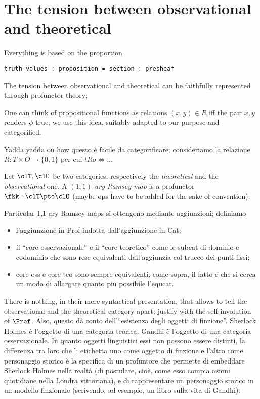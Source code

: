 \documentclass[a4paper]{../birkjour}
\begin{document}
\section{The tension between observational and theoretical}
\label{sec:orge11c3c4}
Everything is based on the proportion
\begin{verbatim}
truth values : proposition = section : presheaf
\end{verbatim}
The tension between observational and theoretical can be faithfully represented through profunctor theory;
\begin{remark}
  One can think of propositional functions as relations $(x,y)\in R$ iff the pair $x,y$ renders $\phi$ true; we use this idea, suitably adapted to our purpose and categorified.
\end{remark}
Yadda yadda on how questo è facile da categorificare; consideriamo la relazione $R : T \times O \to \{0,1\}$ per cui $tRo \iff \dots$
\begin{definition}
  Let $\clT,\clO$ be two categories, respectively the \emph{theoretical} and the \emph{observational} one. A \emph{$(1,1)$-ary Ramsey map} is a profunctor $\fkk : \clT \pto \clO$ (maybe ops have to be added for the sake of convention).
\end{definition}
\begin{remark}
  Particolar 1,1-ary Ramsey maps si ottengono mediante aggiunzioni; definiamo
  \begin{itemize}
    \item l'aggiunzione in Prof indotta dall'aggiunzione in Cat;
    \item il ``core osservazionale'' e il ``core teoretico'' come le subcat di dominio e codominio che sono rese equivalenti dall'aggiunzia col trucco dei punti fissi;
    \item core oss e core teo sono sempre equivalenti; come sopra, il fatto è che si cerca un modo di allargare quanto piu possibile l'equcat.
  \end{itemize}
\end{remark}
There is nothing, in their mere syntactical presentation, that allows to tell the observational and the theoretical category apart; justify with the self-involution of $\Prof$. Also, questo dà conto dell'``esistenza degli oggetti di finzione''. Sherlock Holmes è l'oggetto di una categoria teorica. Gandhi è l'oggetto di una categoria osservazionale. In quanto oggetti linguistici essi non possono essere distinti, la differenza tra loro che li etichetta uno come oggetto di finzione e l'altro come personaggio storico è la specifica di un profuntore che permette di embeddare Sherlock Holmes nella realtà (di postulare, cioè, come esso compia azioni quotidiane nella Londra vittoriana), e di rappresentare un personaggio storico in un modello finzionale (scrivendo, ad esempio, un libro sulla vita di Gandhi).
\end{document}
